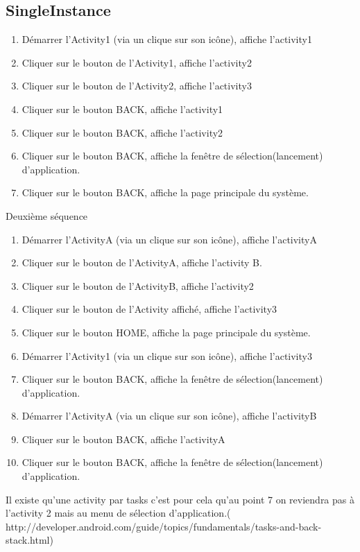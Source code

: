\subsection{SingleInstance}
			\begin{enumerate}
					\item Démarrer l'Activity1 (via un clique sur son icône), affiche l'activity1
					\item Cliquer sur le bouton de l’Activity1, affiche l'activity2
					\item Cliquer sur le bouton de l’Activity2, affiche l'activity3
					\item Cliquer sur le bouton BACK, affiche l'activity1
					\item Cliquer sur le bouton BACK, affiche l'activity2
					\item Cliquer sur le bouton BACK, affiche la fenêtre de sélection(lancement) d'application.
					\item Cliquer sur le bouton BACK, affiche la page principale du système.
			\end{enumerate}
			Deuxième séquence
			\begin{enumerate}
					\item Démarrer l'ActivityA (via un clique sur son icône), affiche l'activityA
					\item Cliquer sur le bouton de l’ActivityA, affiche l'activity B.
					\item  Cliquer sur le bouton de l’ActivityB, affiche l'activity2
					\item Cliquer sur le bouton de l'Activity affiché, affiche l'activity3
					\item Cliquer sur le bouton HOME, affiche la page principale du système.
					\item Démarrer l'Activity1 (via un clique sur son icône), affiche l'activity3
					\item Cliquer sur le bouton BACK, affiche la fenêtre de sélection(lancement) d'application.
					\item Démarrer l'ActivityA (via un clique sur son icône), affiche l'activityB
					\item Cliquer sur le bouton BACK, affiche l'activityA
					\item Cliquer sur le bouton BACK, affiche la fenêtre de sélection(lancement) d'application.
			\end{enumerate}
			

			Il existe qu'une activity par tasks c'est pour cela qu'au point 7 on reviendra pas à l'activity 2 mais au menu de sélection d'application.( http://developer.android.com/guide/topics/fundamentals/tasks-and-back-stack.html)


